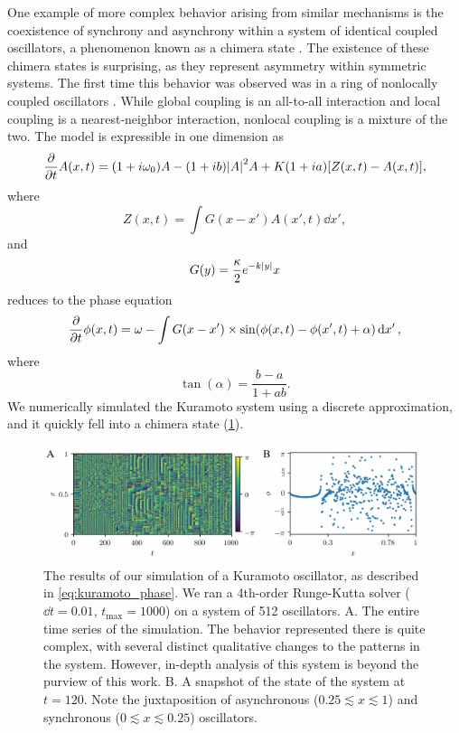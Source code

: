 One example of more complex behavior arising from similar mechanisms is the coexistence of synchrony and asynchrony within a system of identical coupled oscillators, a phenomenon known as a chimera state \cite{Kuramoto2002,Abrams2004}.
The existence of these chimera states is surprising, as they represent asymmetry within symmetric systems.
The first time this behavior was observed was in a ring of nonlocally coupled oscillators \cite{Kuramoto2002}.
While global coupling is an all-to-all interaction and local coupling is a nearest-neighbor interaction, nonlocal coupling is a mixture of the two.
The model is expressible in one dimension as
\begin{equation}
  \label{eq:kuramoto}
  \pdv{t} A(x, t)
  =
  \pqty{1 + i \omega_{0}} A
  -
  \pqty{1 + i b} \abs{A}^{2} A
  +
  K \pqty{1 + i a} \bqty{Z(x, t) - A(x, t)},
\end{equation}
where
\begin{equation*}
  \label{eq:kuramoto_coupling}
  Z(x, t)
  =
  \int{G(x - x') A(x', t) \dd{x'}},
\end{equation*}
and
\begin{equation*}
  G(y)
  =
  \frac{\kappa}{2} e^{-k \abs{y}}x
\end{equation*}
 reduces to the phase equation
\begin{equation}
  \label{eq:kuramoto_phase}
  \pdv{t} \phi(x, t)
  =
  \omega
  -
  \int G(x - x') \times
  \sin(\phi(x, t) - \phi(x', t) + \alpha) \dd{x'},
\end{equation}
where
\begin{equation}
  \tan(\alpha)
  =
  \frac{b - a}{1 + a b}.
\end{equation}
We numerically simulated the Kuramoto system using a discrete approximation, and it quickly fell into a chimera state (\cref{fig:kuramoto}).
\begin{figure}[ht]
  \centering
  \includegraphics[width=\textwidth]{figure/kuramoto.pdf}
  \caption[Kuramoto simulation]{The results of our simulation of a Kuramoto oscillator, as described in \cref{eq:kuramoto_phase}.
    We ran a 4th-order Runge-Kutta solver ($\dd{t} = 0.01$, $t_{\text{max}} = 1000$) on a system of 512 oscillators.
    A. The entire time series of the simulation.
    The behavior represented there is quite complex, with several distinct qualitative changes to the patterns in the system.
    However, in-depth analysis of this system is beyond the purview of this work.
    B. A snapshot of the state of the system at $t = 120$.
    Note the juxtaposition of asynchronous ($0.25 \lesssim x \lesssim 1$) and synchronous ($0 \lesssim x \lesssim 0.25$) oscillators.
  }
  \label{fig:kuramoto}
\end{figure}

